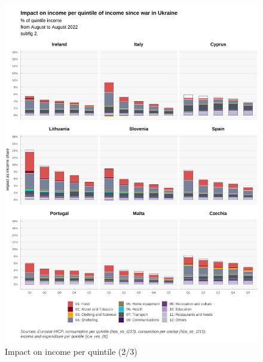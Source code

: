 \documentclass[
  9pt,
  a4paper,
  numbers=noendperiod,
  DIV=12]{scrartcl}
\begin{document}
\begin{figure}

\caption{Impact on income per quintile (2/3)}

{\centering \includegraphics{../svg/coicop_l1_1y_2.png}

}

\end{figure}
\end{document}
